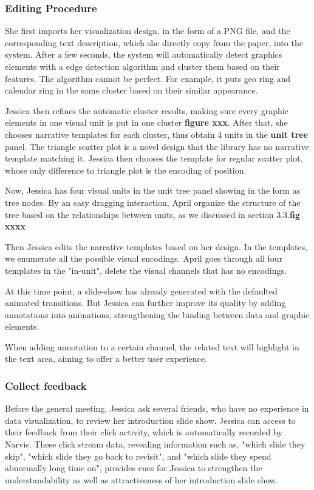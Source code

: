 \subsubsection{Editing Procedure}
She first imports her visualization design, in the form of a PNG file, and the corresponding text description, which she directly copy from the paper, into the system. After a few seconds, the system will automatically detect graphics elements with a edge detection algorithm and cluster them based on their features. The algorithm cannot be perfect. For example, it puts geo ring and calendar ring in the same cluster based on their similar appearance. \par
Jessica then refines the automatic cluster results, making sure every graphic elements in one visual unit is put in one cluster \textbf{figure xxx}. After that, she chooses narrative templates for each cluster, thus obtain 4 units in the \textbf{unit tree} panel. The triangle scatter plot is a novel design that the library has no narrative template matching it. Jessica then chooses the template for regular scatter plot, whose only difference to triangle plot is the encoding of position. \par
Now, Jessica has four visual units in the unit tree panel showing in the form as tree nodes. By an easy dragging interaction, April organize the structure of the tree based on the relationships between units, as we discussed in section 3.3.\textbf{fig xxxx}\par
Then Jessica edits the narrative templates based on her design. In the templates, we enumerate all the possible visual encodings. April goes through all four templates in the "in-unit", delete the visual channels that has no encodings. \par
At this time point, a slide-show has already generated with the defaulted animated transitions. But Jessica can further improve its quality by adding annotations into animations, strengthening the binding between data and graphic elements. \par
When adding annotation to a certain channel, the related text will highlight in the text area, aiming to offer a better user experience. \par  
\subsubsection{Collect feedback}

Before the general meeting, Jessica ask several friends, who have no experience in data visualization, to review her introduction slide show. Jessica can access to their feedback from their click activity, which is automatically recorded by Narvis. These click stream data, revealing information such as, "which slide they skip", "which slide they go back to revisit", and "which slide they spend abnormally long time on", provides cues for Jessica to strengthen the understandability as well as attractiveness of her introduction slide show.  